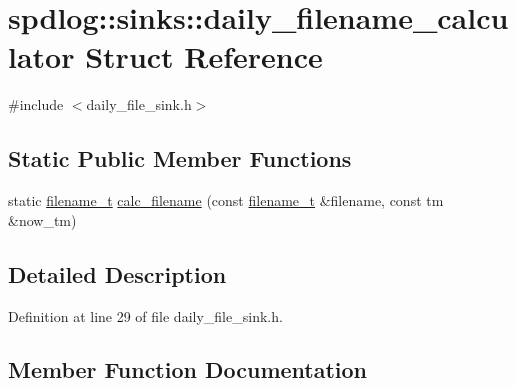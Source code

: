 \hypertarget{structspdlog_1_1sinks_1_1daily__filename__calculator}{}\section{spdlog\+:\+:sinks\+:\+:daily\+\_\+filename\+\_\+calculator Struct Reference}
\label{structspdlog_1_1sinks_1_1daily__filename__calculator}


{\ttfamily \#include $<$daily\+\_\+file\+\_\+sink.\+h$>$}

\subsection*{Static Public Member Functions}
\begin{DoxyCompactItemize}
\item 
static \hyperlink{namespacespdlog_acf7ce125b3622e44f8f1702d699e0b06}{filename\+\_\+t} \hyperlink{structspdlog_1_1sinks_1_1daily__filename__calculator_ae8461e586d3426987a3b11a00b158db2}{calc\+\_\+filename} (const \hyperlink{namespacespdlog_acf7ce125b3622e44f8f1702d699e0b06}{filename\+\_\+t} \&filename, const tm \&now\+\_\+tm)
\end{DoxyCompactItemize}


\subsection{Detailed Description}


Definition at line 29 of file daily\+\_\+file\+\_\+sink.\+h.



\subsection{Member Function Documentation}
\mbox{\label{structspdlog_1_1sinks_1_1daily__filename__calculator_ae8461e586d3426987a3b11a00b158db2}} 
